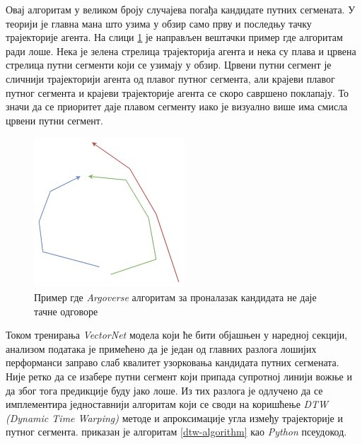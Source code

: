 \documentclass[11pt,oneside]{memoir}
\begin{document}
Овај алгоритам у великом броју случајева погађа кандидате путних сегмената. У теорији је главна мана што узима у обзир само прву и последњу
тачку трајекторије агента. На слици \ref{argoverse-clcand-flaws} је направљен вештачки пример где алгоритам ради лоше. Нека је зелена стрелица
трајекторија агента и нека су плава и црвена стрелица путни сегменти који се узимају у обзир. Црвени путни сегмент је сличнији
трајекторији агента од плавог путног сегмента, али крајеви плавог путног сегмента и крајеви трајекторије агента се скоро савршено поклапају. 
То значи да се приоритет даје плавом сегменту иако је визуално више има смисла црвени путни сегмент.

\begin{figure}[H]
  \centering
  \includegraphics[width=0.5\textwidth]{images/argoverse-clcand-flaws.drawio.png}
  \caption{Пример где \textit{Argoverse} алгоритам за проналазак кандидата не даје тачне одговоре}
  \label{argoverse-clcand-flaws}
\end{figure}

Током тренирања \textit{VectorNet} модела који ће бити објашњен у наредној секцији, анализом података је примећено да је један од главних
разлога лошијих перформанси заправо слаб квалитет узорковања кандидата путних сегмената. Није ретко да се изабере путни сегмент који припада
супротној линији вожње и да због тога предикције буду јако лоше. Из тих разлога је одлучено да се имплементира једноставнији алгоритам
који се своди на коришћење \textit{DTW (Dynamic Time Warping)} методе и апроксимације угла између трајекторије и путног сегмента. приказан
је алгоритам \ref{dtw-algorithm} као \textit{Python} псеудокод.
\end{document}
